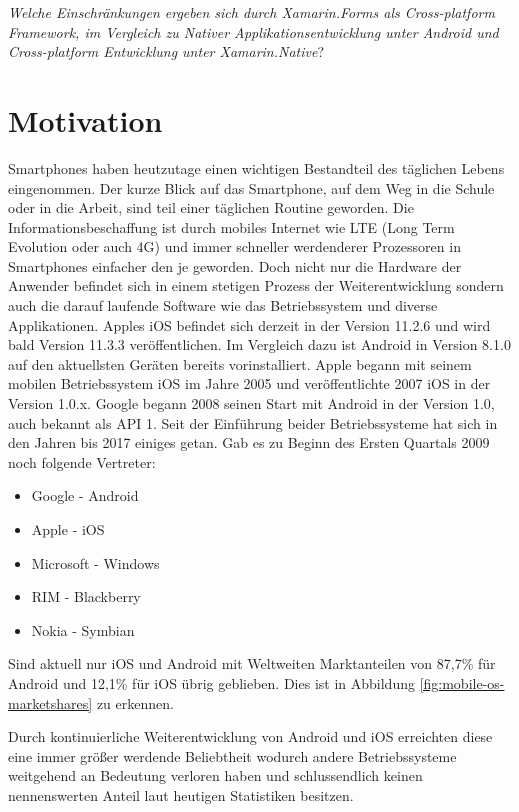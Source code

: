 	\textit{Welche Einschränkungen ergeben sich durch Xamarin.Forms als Cross-platform Framework, im Vergleich zu Nativer Applikationsentwicklung unter Android und Cross-platform Entwicklung unter Xamarin.Native}?

\section{Motivation}
\label{sec:motivation}

	Smartphones haben heutzutage einen wichtigen Bestandteil des täglichen Lebens eingenommen. Der kurze Blick auf das Smartphone, auf dem Weg in die Schule oder in die Arbeit, sind teil einer täglichen Routine geworden. Die Informationsbeschaffung ist durch mobiles Internet wie LTE (Long Term Evolution oder auch 4G) und immer schneller werdenderer Prozessoren in Smartphones einfacher den je geworden. Doch nicht nur die Hardware der Anwender befindet sich in einem stetigen Prozess der Weiterentwicklung sondern auch die darauf laufende Software wie das Betriebssystem und diverse Applikationen. Apples iOS befindet sich derzeit in der Version 11.2.6 und wird bald Version 11.3.3 veröffentlichen. Im Vergleich dazu ist Android in Version 8.1.0 auf den aktuellsten Geräten bereits vorinstalliert. Apple begann mit seinem mobilen Betriebssystem iOS im Jahre 2005 und veröffentlichte 2007 iOS in der Version 1.0.x. Google begann 2008 seinen Start mit Android in der Version 1.0, auch bekannt als API 1. Seit der Einführung beider Betriebssysteme hat sich in den Jahren bis 2017 einiges getan. Gab es zu Beginn des Ersten Quartals 2009 noch folgende Vertreter:
	\begin{itemize}
		\setlength\itemsep{0em}
		\item Google - Android
		\item Apple - iOS
		\item Microsoft - Windows
		\item RIM - Blackberry
		\item Nokia - Symbian
	\end{itemize}

	Sind aktuell nur iOS und Android mit Weltweiten Marktanteilen von 87,7\% für Android und 12,1\% für iOS übrig geblieben. Dies ist in Abbildung \ref{fig:mobile-os-marketshares} zu erkennen.

	Durch kontinuierliche Weiterentwicklung von Android und iOS erreichten diese eine immer größer werdende Beliebtheit wodurch andere Betriebssysteme weitgehend an Bedeutung verloren haben und schlussendlich keinen nennenswerten Anteil laut heutigen Statistiken besitzen.

